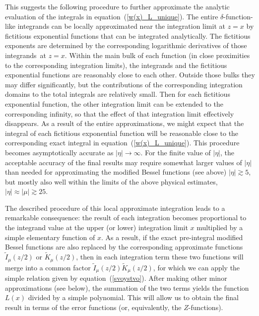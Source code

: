 \documentclass[draft]{agujournal2019}
\begin{document}
{This suggests the following procedure to further approximate the analytic
evaluation of the integrals in equation~(\ref{w(x)_L_unique}). The entire
$\delta$-function-like integrands can be locally approximated near the 
integration limit at $z=x$ by fictitious exponential functions that can be
integrated analytically. The fictitious exponents are determined by the
corresponding logarithmic derivatives of those integrands\ at $z=x$. Within
the main bulk of each function (in close proximities to the corresponding
integration limits), the integrands and the fictitious exponential functions
are reasonably close to each other. Outside those bulks they may differ
significantly, but the contributions of the corresponding integration domains to the
total integrals are relatively small. Then for each fictitious exponential
function, the other integration limit can be extended to the corresponding
infinity, so that the effect of that integration limit effectively 
disappears. As a result of the entire approximations, we might
expect that the integral of each fictitious exponential function will be
reasonable close to the corresponding exact integral in
equation~(\ref{w(x)_L_unique}). This procedure becomes asymptotically accurate
as $|\eta| \rightarrow\infty$. For the finite value of
$|\eta|$, the acceptable accuracy of the final results
may require somewhat larger values of $|\eta|$ than needed for approximating the
modified Bessel functions (see above) $|\eta| \gtrsim5$,
but mostly also well within the limits of the above physical estimates, $|\eta| \approx |\mu| \gtrsim 25$.

The described procedure of this local approximate integration leads to a
remarkable consequence: the result of each integration becomes proportional to
the integrand value at the upper (or lower) integration limit $x$ multiplied
by a simple elementary function of $x$. As a result, if the exact pre-integral
modified Bessel functions are also replaced by the corresponding approximate
functions $\tilde{I}_{\mu}\left(  z/2\right)  $ or $\tilde{K}_{\mu}\left(
z/2\right)  $, then in each integration term these two functions will merge
into a common factor $\tilde{I}_{\mu}\left(  z/2\right)  \tilde{K}_{\mu
}\left(  z/2\right)  $, for which we can apply the simple relation given by
equation~(\ref{svoystvo}). After making other minor approximations (see
below), the summation of the two terms yields the function $L\left(  x\right)
$ divided by a simple polynomial. This will allow us to obtain the final
result in terms of the error functions (or, equivalently, the $Z$-functions).

}
\end{document}
